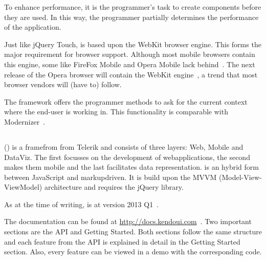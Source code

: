\documentclass[a4paper]{artikel3}
\renewcommand{\url}[1]{\href{#1}{#1}}
\newcommand{\setspace}[0]{\vspace{2mm}}
\renewcommand{\paragraph}[1]{\setspace \noindent {\bf #1}  }
\begin{document}
To enhance performance,  it is the programmer's task to create components before they are used.  
In this way,  the programmer partially determines the performance of the application.

\paragraph{Browser support}
Just like jQuery Touch,  \sta{} is based upon the WebKit browser engine.  
This forms the major requirement for browser support.  
Although most mobile browsers contain this engine,  some like FireFox Mobile and Opera Mobile lack behind~\cite{JohnEClark2012}.  
The next release of the Opera browser will contain the WebKit engine~\cite{Wokke2013}, a trend that most browser vendors will (have to) follow.

The framework offers the programmer methods to ask for the current context where the end-user is working in.
This functionality is comparable with Modernizer~\cite{Modernizr2012}.  


\subsection{\kendo} %
\label{sec:frameworks-kendo}

\kendo{} (\kendob{}) is a framefrom from Telerik and consists of three layers:  \kendo{} Web,  \kendo{} Mobile and \kendo{} DataViz.
The first focusses on the development of webapplications,  the second makes them mobile and the last facilitates data representation.
\kendo{} is an hybrid form between JavaScript and markupdriven.
It is build upon the MVVM (Model-View-ViewModel) architecture and requires the jQuery library.

As at the time of writing,  \kendo{} is at version 2013 Q1~\cite{Telerik}. 

\paragraph{Documentation}
The documentation can be found at \url{http://docs.kendoui.com}~\cite{Telerikd}.
Two important sections are the API and Getting Started.
Both sections follow the same structure and each feature from the API is explained in detail in the Getting Started section.
Also,  every feature can be viewed in a demo with the corresponding code.
\end{document}
